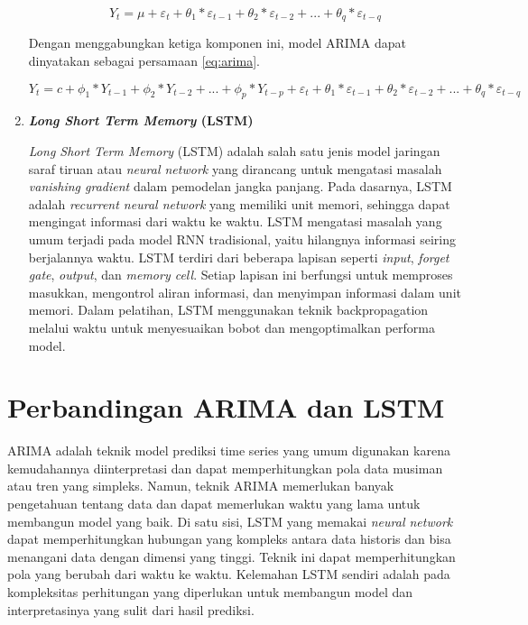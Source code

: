 \begin{enumerate}
    \begin{equation}
        \label{eq:ma}
        Y_t = \mu + \varepsilon_t + \theta_1 * \varepsilon_{t-1} + \theta_2 * \varepsilon_{t-2} + ... + \theta_q * \varepsilon_{t-q}
    \end{equation}

    Dengan menggabungkan ketiga komponen ini, model ARIMA dapat dinyatakan sebagai persamaan \ref{eq:arima}.

    \begin{equation}
        \label{eq:arima}
        Y_t = c + \phi_1 * Y_{t-1} + \phi_2 * Y_{t-2} + ... + \phi_p * Y_{t-p} + \varepsilon_t + \theta_1 * \varepsilon_{t-1} + \theta_2 * \varepsilon_{t-2} + ... + \theta_q * \varepsilon_{t-q}
    \end{equation}

    \item \textbf{\textit{Long Short Term Memory} (LSTM)}
    
    \textit{Long Short Term Memory} (LSTM) adalah salah satu jenis model jaringan saraf tiruan atau \textit{neural network} yang dirancang untuk mengatasi masalah \textit{vanishing gradient} dalam pemodelan jangka panjang. Pada dasarnya, LSTM adalah \textit{recurrent neural network} yang memiliki unit memori, sehingga dapat mengingat informasi dari waktu ke waktu. LSTM mengatasi masalah yang umum terjadi pada model RNN tradisional, yaitu hilangnya informasi seiring berjalannya waktu. LSTM terdiri dari beberapa lapisan seperti \textit{input}, \textit{forget gate}, \textit{output}, dan \textit{memory cell}. Setiap lapisan ini berfungsi untuk memproses masukkan, mengontrol aliran informasi, dan menyimpan informasi dalam unit memori. Dalam pelatihan, LSTM menggunakan teknik backpropagation melalui waktu untuk menyesuaikan bobot dan mengoptimalkan performa model. 

\end{enumerate}

\section{Perbandingan ARIMA dan LSTM}

ARIMA adalah teknik model prediksi time series yang umum digunakan karena kemudahannya diinterpretasi dan dapat memperhitungkan pola data musiman atau tren yang simpleks. Namun, teknik ARIMA memerlukan banyak pengetahuan tentang data dan dapat memerlukan waktu yang lama untuk membangun model yang baik. Di satu sisi, LSTM yang memakai \textit{neural network} dapat memperhitungkan hubungan yang kompleks antara data historis dan bisa menangani data dengan dimensi yang tinggi. Teknik ini dapat memperhitungkan pola yang berubah dari waktu ke waktu. Kelemahan LSTM sendiri adalah pada kompleksitas perhitungan yang diperlukan untuk membangun model dan interpretasinya yang sulit dari hasil prediksi.

